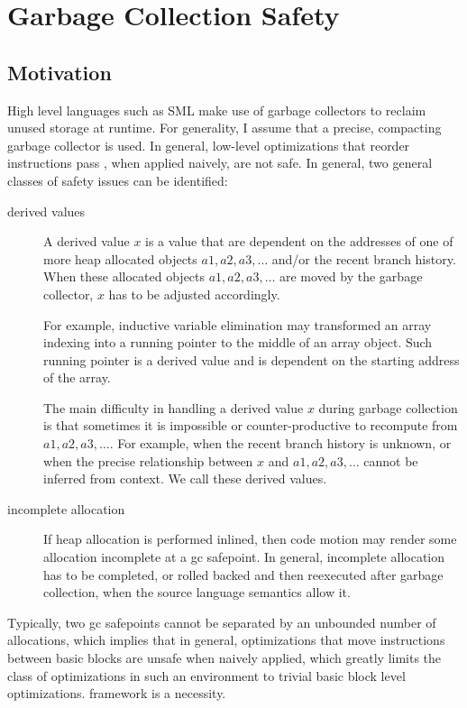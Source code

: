 \section{Garbage Collection Safety}
\subsection{Motivation}
   High level languages such as SML make use of garbage collectors
to reclaim unused storage at runtime.   For generality, I assume that
a precise, compacting garbage collector is used.  In general, 
low-level optimizations that reorder instructions 
pass , when applied naively, 
are not safe.  In general, two general classes of safety issues can be identified:
\begin{description}
 \item[derived values] 
A derived value $x$ is a value that are
dependent on the addresses of one of more heap allocated objects
$a1,a2,a3,\ldots$ and/or the recent branch history.
When these allocated objects $a1,a2,a3,\ldots$
are moved by the garbage collector, $x$
has to be adjusted accordingly.  

For example, inductive variable elimination may transformed an array
indexing into a running pointer to the middle of an array object.
Such running pointer is a derived value and is dependent on the 
starting address of the array. 

The main difficulty in handling a derived value $x$ 
during garbage collection is that sometimes it is impossible or 
counter-productive to recompute from $a1,a2,a3,\ldots$.
For example, when the recent branch history is unknown, or when the
precise relationship between $x$ and $a1,a2,a3,\ldots$ cannot
be inferred from context.  
We call these  derived values.  
  \item[incomplete allocation]
   If heap allocation is performed inlined, then code motion may 
render some allocation incomplete at a gc safepoint.  In general, incomplete
allocation has to be completed, or rolled backed and then reexecuted
after garbage collection, when the source language semantics allow it.
\end{description}

Typically, two gc safepoints cannot be separated by an unbounded
number of allocations, which implies that in general, optimizations that move
instructions between basic blocks are unsafe when naively applied,
which greatly limits the class of optimizations in such an environment
to trivial basic block level optimizations. 
framework is a necessity.


